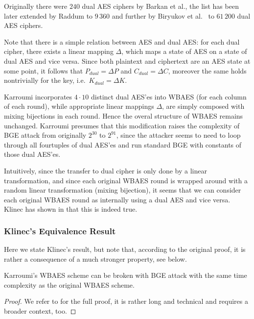 	Originally there were $240$ dual AES ciphers by Barkan et al., the list has been later extended by Raddum \cite{raddum2004more} to $9\,360$ and further by Biryukov et al.\ \cite{biryukov2003toolbox} to $61\,200$ dual AES ciphers.
	
	Note that there is a simple relation between AES and dual AES: for each dual cipher, there exists a linear mapping $\Delta$, which maps a state of AES on a state of dual AES and vice versa. Since both plaintext and ciphertext are an AES state at some point, it follows that $P_{dual} = \Delta P$ and $C_{dual} = \Delta C$, moreover the same holds nontrivially for the key, i.e.\ $K_{dual} = \Delta K$.
	
	Karroumi incorporates $4\cdot 10$ distinct dual AES'es into WBAES (for each column of each round), while appropriate linear mappings $\Delta$, are simply composed with mixing bijections in each round. Hence the overal structure of WBAES remains unchanged. Karroumi presumes that this modification raises the complexity of BGE attack from originally $2^{30}$ to $2^{91}$, since the attacker seems to need to loop through all fourtuples of dual AES'es and run standard BGE with constants of those dual AES'es.
	
	Intuitively, since the transfer to dual cipher is only done by a linear transformation, and since each original WBAES round is wrapped around with a random linear transformation (mixing bijection), it seems that we can consider each original WBAES round as internally using a dual AES and vice versa. Klinec has shown in \cite[Proposition~2]{klinec2013white} that this is indeed true.

\subsubsection{Klinec's Equivalence Result}
	
	Here we state Klinec's result, but note that, according to the original proof, it is rather a consequence of a much stronger property, see below.
	
	\begin{prop}[Klinec]
	\label{thm:dualequiv}
		Karroumi's WBAES scheme can be broken with BGE attack with the same time complexity as the original WBAES scheme.
	\end{prop}
	
	\begin{proof}
		We refer to \cite{klinec2013white} for the full proof, it is rather long and technical and requires a broader context, too.
	\end{proof}
	
